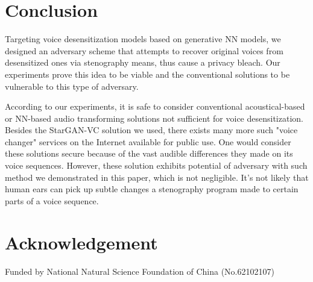 \documentclass[journal]{IEEEtran} %
\begin{document}
\section{Conclusion}
\label{seg:conclusion}

Targeting voice desensitization models based on generative NN models, we designed an adversary scheme that attempts to recover original voices from desensitized ones via stenography means, thus cause a privacy bleach. Our experiments prove this idea to be viable and the conventional solutions to be vulnerable to this type of adversary.

According to our experiments, it is safe to consider conventional acoustical-based or NN-based audio transforming solutions not sufficient for voice desensitization. Besides the StarGAN-VC solution we used, there exists many more such "voice changer" services on the Internet available for public use. One would consider these solutions secure because of the vast audible differences they made on its voice sequences. However, these solution exhibits potential of adversary with such method we demonstrated in this paper, which is not negligible. It's not likely that human ears can pick up subtle changes a stenography program made to certain parts of a voice sequence.

\section{Acknowledgement}
Funded by National Natural Science Foundation of China (No.62102107)
\end{document}
